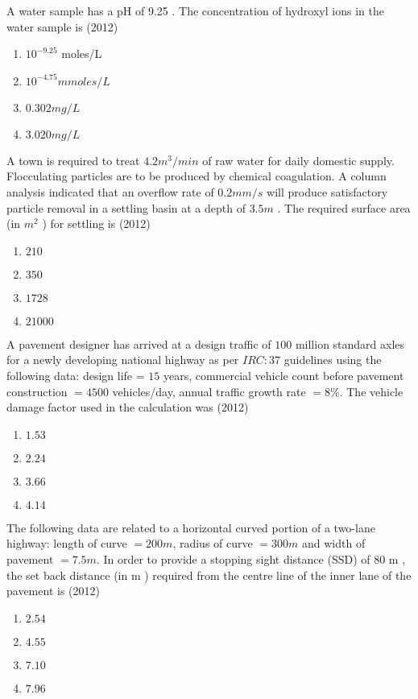        \item A water sample has a pH of 9.25 . The concentration of hydroxyl ions in the water sample is
       \hfill{(2012)}
		\begin{enumerate}
			\item $10^{-9.25}$ moles/L
			\item $10^{-4.75} mmoles/L$
			\item $0.302mg/L$
			\item $3.020mg/L$
		\end{enumerate}
	\item  A town is required to treat $4.2 m^{3} / min$ of raw water for daily domestic supply. Flocculating particles are to be produced by chemical coagulation. A column analysis indicated that an overflow rate of $0.2 mm / s$ will produce satisfactory particle removal in a settling basin at a depth of $3.5 m$ . The required surface area (in $m^{2}$ ) for settling is
	\hfill{(2012)}
		\begin{enumerate}
			\item $210$
			\item $350$
			\item$1728$
	        \item $21000$
        	\end{enumerate}
	\item A pavement designer has arrived at a design traffic of $100$ million standard axles for a newly developing national highway as per $IRC:37$ guidelines using the following data: design life = $15$ years, commercial vehicle count before pavement construction $=4500$ vehicles/day, annual traffic growth rate $=8 \%$. The vehicle damage factor used in the calculation was
	\hfill{(2012)}
		\begin{enumerate}
		       \item $1.53$
		       \item $2.24$
		       \item $3.66$
		       \item $4.14$
        	\end{enumerate}	
	\item The following data are related to a horizontal curved portion of a two-lane highway: length of curve $=200 m$, radius of curve $=300 m$ and width of pavement $=7.5 m$. In order to provide a stopping sight distance (SSD) of $80$ m , the set back distance (in m ) required from the centre line of the inner lane of the pavement is
	\hfill{(2012)}
		\begin{enumerate}
			\item $2.54$
			\item $4.55$
			\item $7.10$ 
			\item $7.96$ 
        	\end{enumerate}
